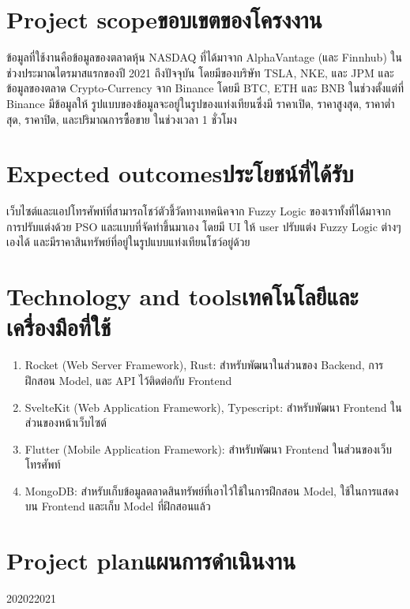 \section{\ifenglish Project scope\else ขอบเขตของโครงงาน\fi}
ข้อมูลที่ใช้งานคือข้อมูลของตลาดหุ้น NASDAQ ที่ได้มาจาก AlphaVantage (และ Finnhub) ในช่วงประมาณไตรมาสแรกของปี 2021 ถึงปัจจุบัน โดยมีของบริษัท TSLA, NKE, และ JPM 
และข้อมูลของตลาด Crypto-Currency จาก Binance โดยมี BTC, ETH และ BNB ในช่วงตั้งแต่ที่ Binance มีข้อมูลให้ 
รูปแบบของข้อมูลจะอยู่ในรูปของแท่งเทียนซึ่งมี ราคาเปิด, ราคาสูงสุด, ราคาต่ำสุด, ราคาปิด, และปริมาณการซื้อขาย ในช่วงเวลา 1 ชั่วโมง 

\section{\ifenglish Expected outcomes\else ประโยชน์ที่ได้รับ\fi}
เว็บไซต์และแอปโทรศัพท์ที่สามารถโชว์ตัวชี้วัดทางเทคนิคจาก Fuzzy Logic ของเราทั้งที่ได้มาจากการปรับแต่งด้วย PSO และแบบที่จัดทำขึ้นมาเอง 
โดยมี UI ให้ user ปรับแต่ง Fuzzy Logic ต่างๆ เองได้ และมีราคาสินทรัพย์ที่อยู่ในรูปแบบแท่งเทียนโชว์อยู่ด้วย

\section{\ifenglish Technology and tools\else เทคโนโลยีและเครื่องมือที่ใช้\fi}
\begin{enumerate}
    \item Rocket (Web Server Framework), Rust: สำหรับพัฒนาในส่วนของ Backend, การฝึกสอน Model, และ API ไว้ติดต่อกับ Frontend
    \item SvelteKit (Web Application Framework), Typescript: สำหรับพัฒนา Frontend ในส่วนของหน้าเว็บไซต์
    \item Flutter (Mobile Application Framework): สำหรับพัฒนา Frontend ในส่วนของเว็บโทรศัพท์
    \item MongoDB: สำหรับเก็บข้อมูลตลาดสินทรัพย์ที่เอาไว้ใช้ในการฝึกสอน Model, ใช้ในการแสดงบน Frontend และเก็บ Model ที่ฝึกสอนแล้ว
\end{enumerate}

\section{\ifenglish Project plan\else แผนการดำเนินงาน\fi}

\begin{plan}{6}{2020}{2}{2021}
\end{plan}

